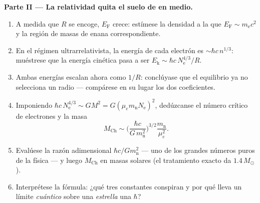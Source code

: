 \begin{problem}
\medskip\noindent\textbf{Parte II --- La relatividad quita el suelo de en
medio.}
\begin{enumerate}[resume]
  \item A medida que $R$ se encoge, $E_{\text{F}}$ crece: estímese la densidad
        a la que $E_{\text{F}} \sim m_{\text{e}}c^2$ y la
        región de masas de enana correspondiente.
  \item En el régimen ultrarrelativista, la energía de cada electrón es
        $\sim\hbar c\,n^{1/3}$: muéstrese que la energía cinética pasa a ser
        $E_{\text{k}} \sim \hbar c\,N_{\text{e}}^{4/3}/R$.
  \item Ambas energías escalan ahora como $1/R$: conclúyase que el
        equilibrio ya no selecciona un radio --- compárese en su lugar los dos
        coeficientes.
  \item Imponiendo $\hbar c\,N_{\text{e}}^{4/3} \sim
        GM^2 = G(\mu_em_{\text{n}}N_{\text{e}})^2$, dedúzcanse el
        número crítico de electrones y la masa
        \[
        M_{\text{Ch}} \sim
        \Big(\frac{\hbar c}{G\,m_{\text{n}}^2}\Big)^{3/2}
        \frac{m_{\text{n}}}{\mu_e^2} .
        \]
  \item Evalúese la razón adimensional $\hbar c/Gm_{\text{n}}^2$
        --- uno de los grandes números puros de la física --- y luego
        $M_{\text{Ch}}$ en masas solares (el tratamiento exacto da
        $1.4\,M_\odot$).
  \item Interprétese la fórmula: ¿qué tres constantes conspiran y
        por qué lleva un límite \emph{cuántico} sobre una \emph{estrella}
        una $\hbar$?
\end{enumerate}


\end{problem}

